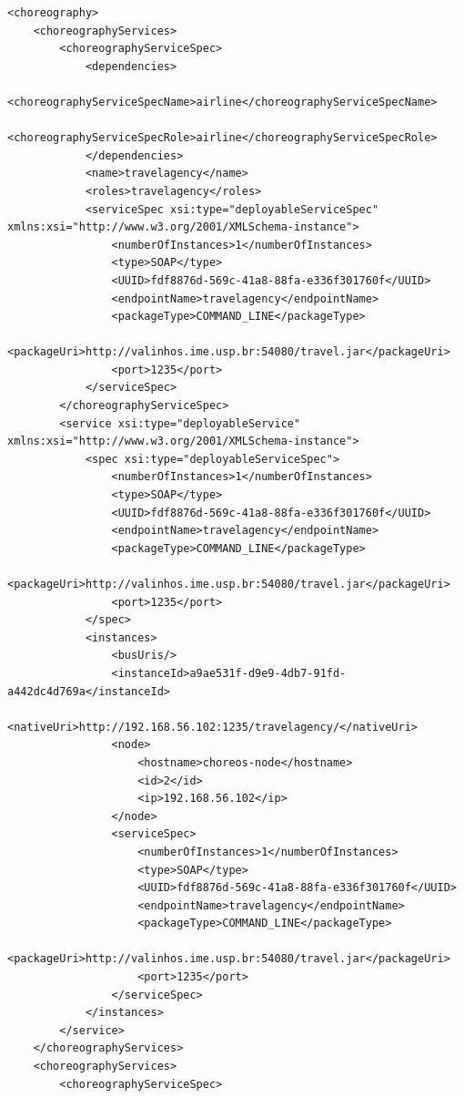 \documentclass[a4paper, 10pt]{article}
\begin{document}
{\begin{lstlisting}[caption=Choreography XML representation example, label=lst:chor_xml]
<choreography>
    <choreographyServices>
        <choreographyServiceSpec>
            <dependencies>
                <choreographyServiceSpecName>airline</choreographyServiceSpecName>
                <choreographyServiceSpecRole>airline</choreographyServiceSpecRole>
            </dependencies>
            <name>travelagency</name>
            <roles>travelagency</roles>
            <serviceSpec xsi:type="deployableServiceSpec" 
xmlns:xsi="http://www.w3.org/2001/XMLSchema-instance">
                <numberOfInstances>1</numberOfInstances>
                <type>SOAP</type>
                <UUID>fdf8876d-569c-41a8-88fa-e336f301760f</UUID>
                <endpointName>travelagency</endpointName>
                <packageType>COMMAND_LINE</packageType>
                <packageUri>http://valinhos.ime.usp.br:54080/travel.jar</packageUri>
                <port>1235</port>
            </serviceSpec>
        </choreographyServiceSpec>
        <service xsi:type="deployableService" 
xmlns:xsi="http://www.w3.org/2001/XMLSchema-instance">
            <spec xsi:type="deployableServiceSpec">
                <numberOfInstances>1</numberOfInstances>
                <type>SOAP</type>
                <UUID>fdf8876d-569c-41a8-88fa-e336f301760f</UUID>
                <endpointName>travelagency</endpointName>
                <packageType>COMMAND_LINE</packageType>
                <packageUri>http://valinhos.ime.usp.br:54080/travel.jar</packageUri>
                <port>1235</port>
            </spec>
            <instances>
                <busUris/>
                <instanceId>a9ae531f-d9e9-4db7-91fd-a442dc4d769a</instanceId>
                <nativeUri>http://192.168.56.102:1235/travelagency/</nativeUri>
                <node>
                    <hostname>choreos-node</hostname>
                    <id>2</id>
                    <ip>192.168.56.102</ip>
                </node>
                <serviceSpec>
                    <numberOfInstances>1</numberOfInstances>
                    <type>SOAP</type>
                    <UUID>fdf8876d-569c-41a8-88fa-e336f301760f</UUID>
                    <endpointName>travelagency</endpointName>
                    <packageType>COMMAND_LINE</packageType>
                    <packageUri>http://valinhos.ime.usp.br:54080/travel.jar</packageUri>
                    <port>1235</port>
                </serviceSpec>
            </instances>
        </service>
    </choreographyServices>
    <choreographyServices>
        <choreographyServiceSpec>

\end{lstlisting}}
\end{document}
